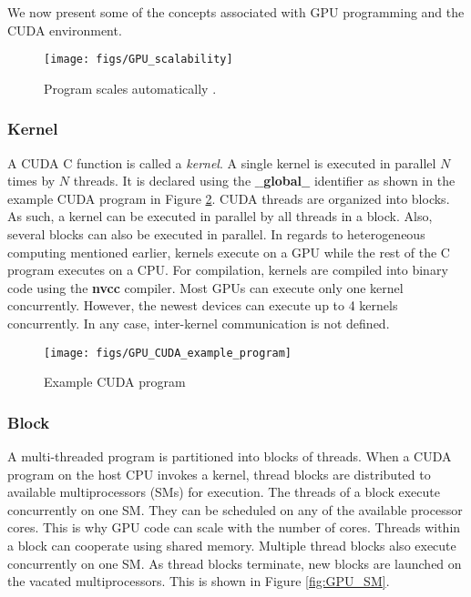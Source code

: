 \documentclass{article}
\begin{document}
We now present some of the concepts associated with GPU programming and the CUDA environment.  

\begin{figure}
	\texttt{[image: figs/GPU\_scalability]}
	\caption{Program scales automatically \cite{2010_MAN_CUDA_Nvidia}.}
	\label{fig:GPU_scalability}
\end{figure}

\subsubsection{Kernel}
A CUDA C function is called a \emph{kernel}.  A single kernel is executed in parallel $N$ times by $N$ threads.  It is declared using the $\_\_$\textbf{global}$\_\_$ identifier as shown in the example CUDA program in Figure \ref{fig:Example_CUDA_program}.  CUDA threads are organized into blocks.  As such, a kernel can be executed in parallel by all threads in a block.  Also, several blocks can also be executed in parallel.  In regards to heterogeneous computing mentioned earlier, kernels execute on a GPU while the rest of the C program executes on a CPU.  For compilation, kernels are compiled into binary code using the \textbf{nvcc} compiler.  Most GPUs can execute only one kernel concurrently.  However, the newest devices can execute up to 4 kernels concurrently.  In any case, inter-kernel communication is not defined.  	

\begin{figure}
	\texttt{[image: figs/GPU\_CUDA\_example\_program]}
	\caption{Example CUDA program}
	\label{fig:Example_CUDA_program}
\end{figure}


\subsubsection{Block}
A multi-threaded program is partitioned into blocks of threads.  When a CUDA program on the host CPU invokes a kernel, thread blocks are distributed to available multiprocessors (SMs) for execution.  The threads of a block execute concurrently on one SM.  They can be scheduled on any of the available processor cores.  This is why GPU code can scale with the number of cores.  Threads within a block can cooperate using shared memory.   Multiple thread blocks also execute concurrently on one SM.  As thread blocks terminate, new blocks are launched on the vacated multiprocessors.  This is shown in Figure \ref{fig:GPU_SM}.  
\end{document}
